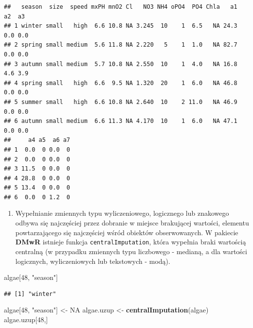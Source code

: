 \documentclass[]{book}
\newenvironment{Shaded}{\begin{snugshade}}{\end{snugshade}}
\newcommand{\DataTypeTok}[1]{\textcolor[rgb]{0.13,0.29,0.53}{#1}}
\newcommand{\DecValTok}[1]{\textcolor[rgb]{0.00,0.00,0.81}{#1}}
\newcommand{\KeywordTok}[1]{\textcolor[rgb]{0.13,0.29,0.53}{\textbf{#1}}}
\newcommand{\NormalTok}[1]{#1}
\newcommand{\OperatorTok}[1]{\textcolor[rgb]{0.81,0.36,0.00}{\textbf{#1}}}
\newcommand{\OtherTok}[1]{\textcolor[rgb]{0.56,0.35,0.01}{#1}}
\newcommand{\StringTok}[1]{\textcolor[rgb]{0.31,0.60,0.02}{#1}}
\providecommand{\tightlist}{%
  \setlength{\itemsep}{0pt}\setlength{\parskip}{0pt}}
\theoremstyle{plain}
\theoremstyle{definition}
\theoremstyle{definition}
\theoremstyle{definition}
\theoremstyle{definition}
\theoremstyle{remark}
\begin{document}
\begin{verbatim}
##   season  size  speed mxPH mnO2 Cl   NO3 NH4 oPO4  PO4 Chla   a1  a2  a3
## 1 winter small   high  6.6 10.8 NA 3.245  10    1  6.5   NA 24.3 0.0 0.0
## 2 spring small medium  5.6 11.8 NA 2.220   5    1  1.0   NA 82.7 0.0 0.0
## 3 autumn small medium  5.7 10.8 NA 2.550  10    1  4.0   NA 16.8 4.6 3.9
## 4 spring small   high  6.6  9.5 NA 1.320  20    1  6.0   NA 46.8 0.0 0.0
## 5 summer small   high  6.6 10.8 NA 2.640  10    2 11.0   NA 46.9 0.0 0.0
## 6 autumn small medium  6.6 11.3 NA 4.170  10    1  6.0   NA 47.1 0.0 0.0
##     a4 a5  a6 a7
## 1  0.0  0 0.0  0
## 2  0.0  0 0.0  0
## 3 11.5  0 0.0  0
## 4 28.8  0 0.0  0
## 5 13.4  0 0.0  0
## 6  0.0  0 1.2  0
\end{verbatim}

\begin{Shaded}
\end{Shaded}

\begin{enumerate}
\def\labelenumi{\arabic{enumi}.}
\setcounter{enumi}{2}
\tightlist
\item
  Wypełnianie zmiennych typu wyliczeniowego, logicznego lub znakowego odbywa się najczęściej przez dobranie w miejsce brakującej wartości, elementu powtarzającego się najczęściej wśród obiektów obserwowanych. W pakiecie \textbf{DMwR} istnieje funkcja \texttt{centralImputation}, która wypełnia braki wartością centralną (w przypadku zmiennych typu liczbowego - medianą, a dla wartości logicznych, wyliczeniowych lub tekstowych - modą).
\end{enumerate}

\begin{Shaded}
\begin{Highlighting}[]
\NormalTok{algae[}\DecValTok{48}\NormalTok{, }\StringTok{"season"}\NormalTok{]}
\end{Highlighting}
\end{Shaded}

\begin{verbatim}
## [1] "winter"
\end{verbatim}

\begin{Shaded}
\begin{Highlighting}[]
\NormalTok{algae[}\DecValTok{48}\NormalTok{, }\StringTok{"season"}\NormalTok{] <-}\StringTok{ }\OtherTok{NA}
\NormalTok{algae.uzup <-}\StringTok{ }\KeywordTok{centralImputation}\NormalTok{(algae)}
\NormalTok{algae.uzup[}\DecValTok{48}\NormalTok{,]}
\end{Highlighting}
\end{Shaded}
\end{document}
